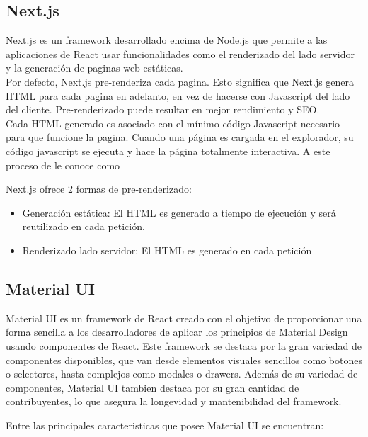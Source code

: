 \subsection{Next.js}

Next.js es un framework desarrollado encima de Node.js que permite a las aplicaciones de React usar funcionalidades como el renderizado del lado servidor y la generación de paginas web estáticas.\\

Por defecto, Next.js pre-renderiza cada pagina. Esto significa que Next.js genera HTML para cada pagina en adelanto, en vez de hacerse con Javascript del lado del cliente. Pre-renderizado puede resultar en mejor rendimiento y SEO.\\

Cada HTML generado es asociado con el mínimo código Javascript necesario para que funcione la pagina. Cuando una página es cargada en el explorador, su código javascript se ejecuta y hace la página totalmente interactiva. A este proceso de le conoce como 

Next.js ofrece 2 formas de pre-renderizado:

\begin{itemize}
  \item Generación estática: El HTML es generado a tiempo de ejecución y será reutilizado en cada petición.
  \item Renderizado lado servidor: El HTML es generado en cada petición
\end{itemize}

\subsection{Material UI}

Material UI es un framework de React creado con el objetivo de proporcionar una forma sencilla a los desarrolladores de aplicar los principios de Material Design \cite{MaterialDesignPrinciples} usando componentes de React. Este framework se destaca por la gran variedad de componentes disponibles, que van desde elementos visuales sencillos como botones o selectores, hasta complejos como modales o drawers. Además de su variedad de componentes, Material UI tambien destaca por su gran cantidad de contribuyentes, lo que asegura la longevidad y mantenibilidad del framework.

Entre las principales caracteristicas que posee Material UI se encuentran:

